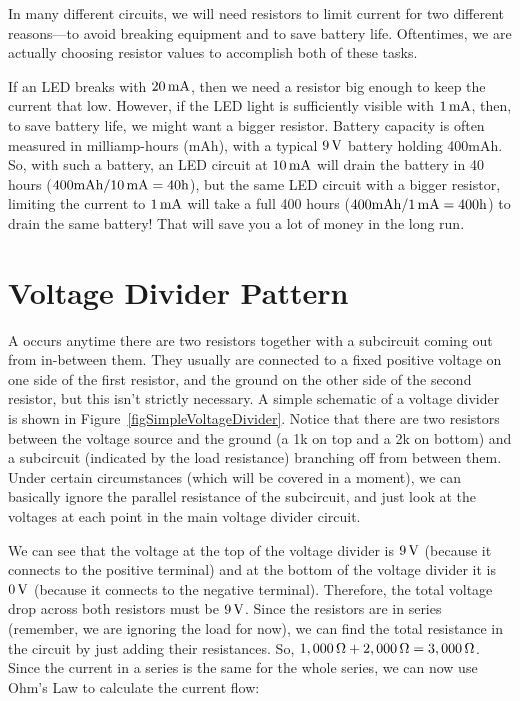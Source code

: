 In many different circuits, we will need resistors to limit current for two different reasons---to avoid breaking equipment and to save battery life.
Oftentimes, we are actually choosing resistor values to accomplish both of these tasks.

If an LED breaks with $20\,\si{\milli\ampere}$, then we need a resistor big enough to keep the current that low.
However, if the LED light is sufficiently visible with $1\,\si{\milli\ampere}$, then, to save battery life, we might want a bigger resistor.
Battery capacity is often measured in milliamp-hours (mAh), with a typical $9\,\si{\volt}$ battery holding 400mAh.  
So, with such a battery, an LED circuit at $10\,\si{\milli\ampere}$ will drain the battery in 40 hours ($400\textrm{mAh} / 10\,\si{\milli\ampere} = 40\textrm{h}$), but the same LED circuit with a bigger resistor, limiting the current to $1\,\si{\milli\ampere}$ will take a full 400 hours ($400\textrm{mAh} / 1\,\si{\milli\ampere} = 400\textrm{h}$) to drain the same battery!
That will save you a lot of money in the long run.

\section{Voltage Divider Pattern}


A  occurs anytime there are two resistors together with a subcircuit coming out from in-between them.
They usually are connected to a fixed positive voltage on one side of the first resistor, and the ground on the other side of the second resistor, but this isn't strictly necessary.
A simple schematic of a voltage divider is shown in Figure~\ref{figSimpleVoltageDivider}.
Notice that there are two resistors between the voltage source and the ground (a 1k on top and a 2k on bottom) and a subcircuit (indicated by the load resistance) branching off from between them.
Under certain circumstances (which will be covered in a moment), we can basically ignore the parallel resistance of the subcircuit, and just look at the voltages at each point in the main voltage divider circuit.

We can see that the voltage at the top of the voltage divider is $9\,\si{\volt}$ (because it connects to the positive terminal) and at the bottom of the voltage divider it is $0\,\si{\volt}$ (because it connects to the negative terminal).  
Therefore, the total voltage drop across both resistors must be $9\,\si{\volt}$.
Since the resistors are in series (remember, we are ignoring the load for now), we can find the total resistance in the circuit by just adding their resistances.
So, $1,000\,\si{\ohm} + 2,000\,\si{\ohm} = 3,000\,\si{\ohm}$.
Since the current in a series is the same for the whole series, we can now use Ohm's Law to calculate the current flow:

